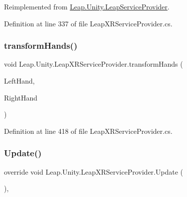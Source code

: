 Reimplemented from \mbox{\hyperlink{class_leap_1_1_unity_1_1_leap_service_provider_a019689a8ce8bc22f6c0effa7010ec215}{Leap.\+Unity.\+Leap\+Service\+Provider}}.



Definition at line 337 of file Leap\+X\+R\+Service\+Provider.\+cs.

\mbox{\label{class_leap_1_1_unity_1_1_leap_x_r_service_provider_ad85fd202780306f400ee2609b37d3293}} 
\subsubsection{\texorpdfstring{transformHands()}{transformHands()}}
{\footnotesize\ttfamily void Leap.\+Unity.\+Leap\+X\+R\+Service\+Provider.\+transform\+Hands (\begin{DoxyParamCaption}\item[{ref \mbox{\hyperlink{struct_leap_1_1_leap_transform}{Leap\+Transform}}}]{Left\+Hand,  }\item[{ref \mbox{\hyperlink{struct_leap_1_1_leap_transform}{Leap\+Transform}}}]{Right\+Hand }\end{DoxyParamCaption})\hspace{0.3cm}{\ttfamily [protected]}}



Definition at line 418 of file Leap\+X\+R\+Service\+Provider.\+cs.

\mbox{\label{class_leap_1_1_unity_1_1_leap_x_r_service_provider_a17b936b12ed7aabdf54af577a4de7f29}} 
\subsubsection{\texorpdfstring{Update()}{Update()}}
{\footnotesize\ttfamily override void Leap.\+Unity.\+Leap\+X\+R\+Service\+Provider.\+Update (\begin{DoxyParamCaption}{ }\end{DoxyParamCaption})\hspace{0.3cm}{\ttfamily [protected]}, {\ttfamily [virtual]}}



